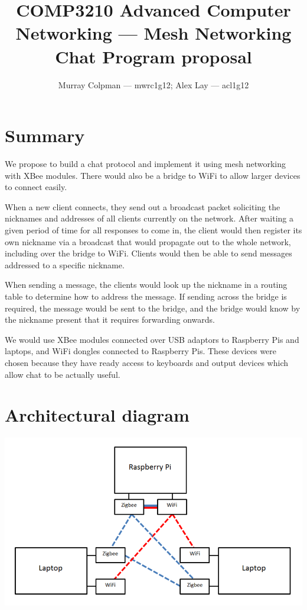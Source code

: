 \documentclass[a4paper,12pt]{article}
\title{COMP3210 Advanced Computer Networking --- Mesh Networking Chat Program
proposal}
\author{Murray Colpman --- mwrc1g12; Alex Lay --- acl1g12}
\begin{document}
\maketitle

\section{Summary}

We propose to build a chat protocol and implement it using mesh networking with
XBee modules. There would also be a bridge to WiFi to allow larger devices to
connect easily.

When a new client connects, they send out a broadcast packet soliciting the
nicknames and addresses of all clients currently on the network. After waiting
a given period of time for all responses to come in, the client would then
register its own nickname via a broadcast that would propagate out to the whole
network, including over the bridge to WiFi. Clients would then be able to send
messages addressed to a specific nickname.

When sending a message, the clients would look up the nickname in a routing
table to determine how to address the message. If sending across the bridge is
required, the message would be sent to the bridge, and the bridge would know by
the nickname present that it requires forwarding onwards.

We would use XBee modules connected over USB adaptors to Raspberry Pis and
laptops, and WiFi dongles connected to Raspberry Pis. These devices were chosen
because they have ready access to keyboards and output devices which allow chat
to be actually useful.

\section{Architectural diagram}

\includegraphics[width=\textwidth]{architectural-diagram}
\end{document}

